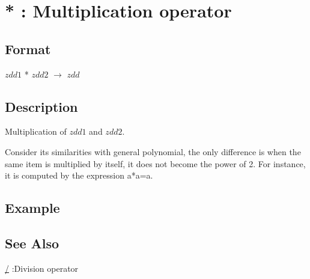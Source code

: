 
\section{* : Multiplication operator\label{sect:multiply}}
\subsection*{Format}
$zdd1$ * $zdd2$ $\rightarrow$ $zdd$

\subsection*{Description}
Multiplication of $zdd1$ and $zdd2$.

Consider its similarities with general polynomial, the only difference is when the same item is multiplied by itself, it does not become the power of 2. 
For instance, it is computed by the expression a*a=a. 

\subsection*{Example}


\subsection*{See Also}
\hyperref[sect:quotiment]{/} :Division operator
